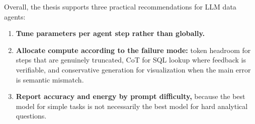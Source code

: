 Overall, the thesis supports three practical recommendations for LLM data
agents:

\begin{enumerate}
    \item \textbf{Tune parameters per agent step rather than globally.}

    \item \textbf{Allocate compute according to the failure mode:} token
          headroom for steps that are genuinely truncated, CoT for SQL lookup
          where feedback is verifiable, and conservative generation for
          visualization when the main error is semantic mismatch.

    \item \textbf{Report accuracy and energy by prompt difficulty,} because
          the best model for simple tasks is not necessarily the best model
          for hard analytical questions.
\end{enumerate}
